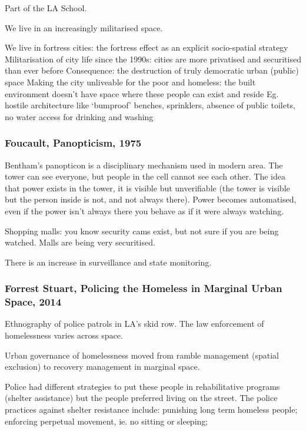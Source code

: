 \documentclass{article}
\begin{document}
Part of the LA School.

We live in an increasingly militarised space.

\begin{outline}
	\1 We live in fortress cities: the fortress effect as an explicit socio-spatial strategy
	\1 Militarisation of city life since the 1990s: cities are more privatised and securitised than ever before
	\1 Consequence: the destruction of truly democratic urban (public) space
	\1 Making the city unliveable for the poor and homeless: the built environment doesn't have space where these people can exist and reside
		\2 Eg. hostile architecture like `bumproof' benches, sprinklers, absence of public toilets, no water access for drinking and washing
\end{outline}

\subsubsection{Foucault, Panopticism, 1975}

Bentham's panopticon is a disciplinary mechanism used in modern area. The tower can see everyone, but people in the cell cannot see each other. The idea that power exists in the tower, it is visible but unverifiable (the tower is visible but the person inside is not, and not always there). Power becomes automatised, even if the power isn't always there you behave as if it were always watching.

Shopping malls: you know security cams exist, but not sure if you are being watched. Malls are being very securitised.

There is an increase in surveillance and state monitoring.

\subsubsection{Forrest Stuart, Policing the Homeless in Marginal Urban Space, 2014}

Ethnography of police patrols in LA's skid row. The law enforcement of homelessness varies across space.

Urban governance of homelessness moved from ramble management (spatial exclusion) to recovery management in marginal space.

Police had different strategies to put these people in rehabilitative programs (shelter assistance) but the people preferred living on the street. The police practices against shelter resistance include: punishing long term homeless people; enforcing perpetual movement, ie. no sitting or sleeping;
\end{document}
